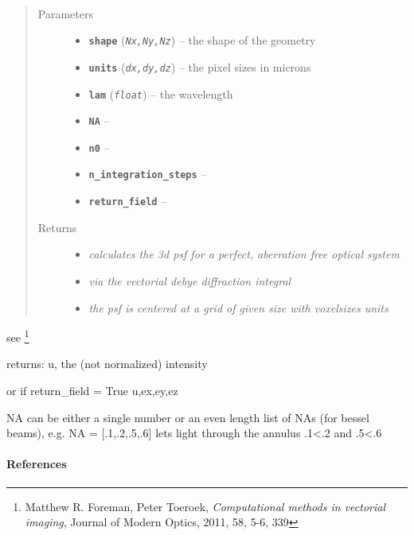 \documentclass[letterpaper,10pt,english]{sphinxmanual}
\begin{document}
\begin{fulllineitems}
\label{bpm:bpm.psf}~\begin{quote}\begin{description}
\item[{Parameters}] \leavevmode\begin{itemize}
\item {} 
\textbf{\texttt{shape}} (\emph{\texttt{Nx,Ny,Nz}}) -- the shape of the geometry

\item {} 
\textbf{\texttt{units}} (\emph{\texttt{dx,dy,dz}}) -- the pixel sizes in microns

\item {} 
\textbf{\texttt{lam}} (\emph{\texttt{float}}) -- the wavelength

\item {} 
\textbf{\texttt{NA}} -- 

\item {} 
\textbf{\texttt{n0}} -- 

\item {} 
\textbf{\texttt{n\_integration\_steps}} -- 

\item {} 
\textbf{\texttt{return\_field}} -- 

\end{itemize}

\item[{Returns}] \leavevmode
\begin{itemize}
\item {} 
\emph{calculates the 3d psf for a perfect, aberration free optical system}

\item {} 
\emph{via the vectorial debye diffraction integral}

\item {} 
\emph{the psf is centered at a grid of given size with voxelsizes units}

\end{itemize}


\end{description}\end{quote}

see \footnote[1]{
Matthew R. Foreman, Peter Toeroek, \emph{Computational methods in vectorial imaging}, Journal of Modern Optics, 2011, 58, 5-6, 339
}

returns:
u, the (not normalized) intensity

or if return\_field = True
u,ex,ey,ez

NA can be either a single number or an even length list of NAs (for bessel beams), e.g.
NA = {[}.1,.2,.5,.6{]} lets light through the annulus .1\textless{}.2 and .5\textless{}.6
\paragraph{References}

\end{fulllineitems}
\end{document}
